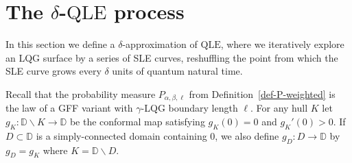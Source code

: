\documentclass[a4paper]{article}
\numberwithin{equation}{section}
\newcommand{\D}{\mathbb{D}}
\newcommand{\QLE}{\mathrm{QLE}}
\theoremstyle{remark}
\numberwithin{equation}{section}
\begin{document}
\section{The $\delta$-$\QLE$ process}\label{sec-qle-approximates}
In this section we define a $\delta$-approximation of $\QLE$, where we iteratively explore an LQG surface by a series of SLE curves, reshuffling the point from which the SLE curve grows every $\delta$ units of quantum natural time. 

Recall that the probability measure $P_{\alpha, \beta, \ell}$ from Definition~\ref{def-P-weighted} is the law of a GFF variant with $\gamma$-LQG boundary length $\ell$. For any hull $K$ let $g_K: \D \backslash K \to \D$ be the conformal map satisfying $g_K(0) = 0$ and $g_K'(0) > 0$. If $D\subset \D$ is a simply-connected domain containing 0, we also define $g_D : D \to \D$ by $g_D = g_K$ where $K = \D \backslash D$.
\end{document}
